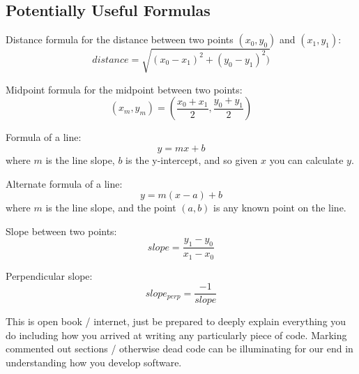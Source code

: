 \documentclass[12pt]{article}
\newcommand{\nl}{\newline}
\begin{document}
\subsection*{Potentially Useful Formulas}

\noindent
Distance formula for the distance between two points $(x_0, y_0)$ and $(x_1,
y_1)$:
$$distance = \sqrt{(x_0 - x_1)^2 + (y_0 - y_1)^2)}$$

\noindent\nl
Midpoint formula for the midpoint between two points:
$$(x_m, y_m) = (\frac{x_0+x_1}{2}, \frac{y_0+y_1}{2})$$

\noindent\nl
Formula of a line:
$$y = mx + b$$ 
where $m$ is the line slope, $b$ is the
y-intercept, and so given $x$ you can calculate $y$.

\noindent\nl
Alternate formula of a line:
$$y = m(x-a)+b$$
where $m$ is the line slope, and the
point $(a,b)$ is any known point on the line.

\noindent\nl
Slope between two points:
$$slope = \frac{y_1 - y_0}{x_1 - x_0}$$

\noindent\nl
Perpendicular slope:
$$slope_{perp} = \frac{-1}{slope}$$

This is open book / internet, just be prepared to deeply explain everything you
do including how you arrived at writing any particularly piece of code. Marking
commented out sections / otherwise dead code can be illuminating for our end in
understanding how you develop software.
\end{document}
